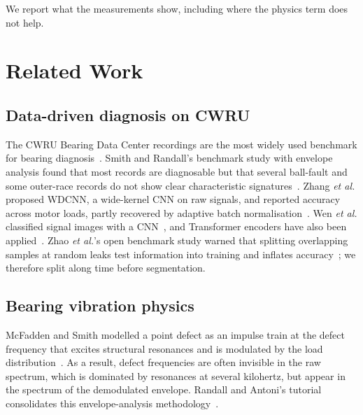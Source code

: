 \documentclass[conference]{IEEEtran}
\begin{document}
We report what the measurements show, including where the physics term does
not help.

\section{Related Work}
\subsection{Data-driven diagnosis on CWRU}
The CWRU Bearing Data Center recordings are the most widely used benchmark for
bearing diagnosis~\cite{cwru}. Smith and Randall's benchmark study with
envelope analysis found that most records are diagnosable but that several
ball-fault and some outer-race records do not show clear characteristic
signatures~\cite{smith2015}. Zhang \emph{et al.} proposed WDCNN, a wide-kernel
CNN on raw signals, and reported accuracy across motor loads, partly recovered
by adaptive batch normalisation~\cite{zhang2017}. Wen \emph{et al.} classified
signal images with a CNN~\cite{wen2018}, and Transformer encoders have also been
applied~\cite{costa2022}. Zhao \emph{et al.}'s open benchmark study warned that
splitting overlapping samples at random leaks test information into training
and inflates accuracy~\cite{zhao2020}; we therefore split along time before
segmentation.

\subsection{Bearing vibration physics}
McFadden and Smith modelled a point defect as an impulse train at the defect
frequency that excites structural resonances and is modulated by the load
distribution~\cite{mcfadden1984}. As a result, defect frequencies are often
invisible in the raw spectrum, which is dominated by resonances at several
kilohertz, but appear in the spectrum of the demodulated envelope. Randall and
Antoni's tutorial consolidates this envelope-analysis methodology~\cite{randall2011}.
\end{document}

